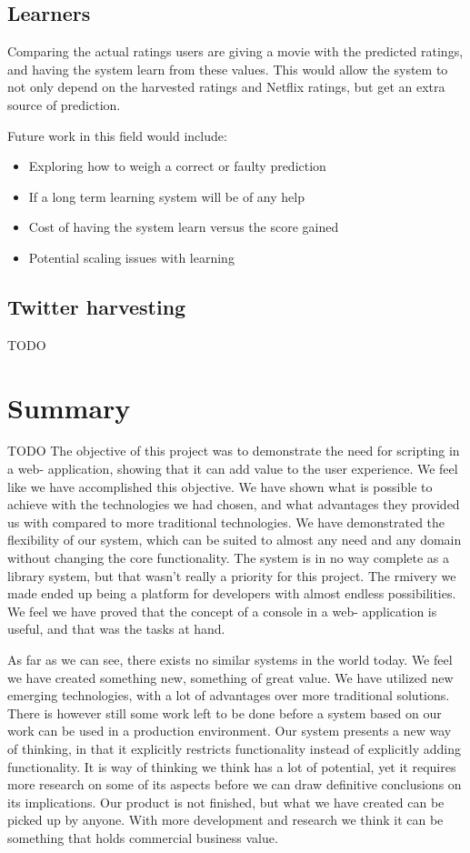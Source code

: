 \subsection{Learners}
Comparing the actual ratings users are giving a movie with the predicted ratings, and having the system learn from these values. This would allow the system to not only depend on the harvested ratings and Netflix ratings, but get an extra source of prediction.

Future work in this field would include:
\begin{itemize}
    \item Exploring how to weigh a correct or faulty prediction
    \item If a long term learning system will be of any help
    \item Cost of having the system learn versus the score gained
    \item Potential scaling issues with learning
\end{itemize}


\subsection{Twitter harvesting}
TODO


\section{Summary}
TODO
The objective of this project was to demonstrate the need for scripting in a web- application, showing that it can add value to the user experience. We feel like we have accomplished this objective. We have shown what is possible to achieve with the technologies we had chosen, and what advantages they provided us with compared to more traditional technologies. We have demonstrated the flexibility of our system, which can be suited to almost any need and any domain without changing the core functionality. The system is in no way complete as a library system, but that wasn’t really a priority for this project. The rmivery we made ended up being a platform for developers with almost endless possibilities. We feel we have proved that the concept of a console in a web- application is useful, and that was the tasks at hand.

As far as we can see, there exists no similar systems in the world today. We feel we have created something new, something of great value. We have utilized new emerging technologies, with a lot of advantages over more traditional solutions. There is however still some work left to be done before a system based on our work can be used in a production environment. Our system presents a new way of thinking, in that it explicitly restricts functionality instead of explicitly adding functionality. It is way of thinking we think has a lot of potential, yet it requires more research on some of its aspects before we can draw definitive conclusions on its implications. Our product is not finished, but what we have created can be picked up by anyone. With more development and research we think it can be something that holds commercial business value.


